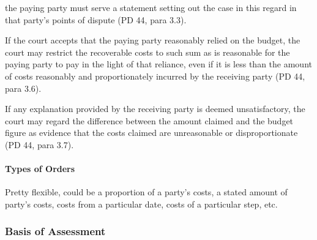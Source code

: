 \documentclass[
]{article}
\begin{document}
the paying party must serve a statement setting out the case in this
regard in that party's points of dispute (PD 44, para 3.3).

If the court accepts that the paying party reasonably relied on the
budget, the court may restrict the recoverable costs to such sum as is
reasonable for the paying party to pay in the light of that reliance,
even if it is less than the amount of costs reasonably and
proportionately incurred by the receiving party (PD 44, para 3.6).

If any explanation provided by the receiving party is deemed
unsatisfactory, the court may regard the difference between the amount
claimed and the budget figure as evidence that the costs claimed are
unreasonable or disproportionate (PD 44, para 3.7).

\hypertarget{types-of-orders}{%
\paragraph{Types of Orders}\label{types-of-orders}}

Pretty flexible, could be a proportion of a party's costs, a stated
amount of party's costs, costs from a particular date, costs of a
particular step, etc.

\hypertarget{basis-of-assessment}{%
\subsubsection{Basis of Assessment}\label{basis-of-assessment}}
\end{document}
